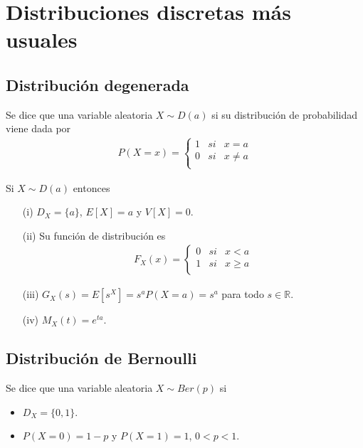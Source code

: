 \chapter{Distribuciones discretas más usuales}


\section{Distribución degenerada}

\begin{defi}
Se dice que una variable aleatoria $X \sim D(a)$ si su distribución de probabilidad viene dada por
\begin{align*}
    P(X = x) = \left\{ \begin{array}{lcc}
             1 &  si  & x = a\\
             0 &  si  & x \not = a\\
             \end{array}
        \right.
\end{align*}
\end{defi}

\begin{obs}
Si $X \sim D(a)$ entonces
\begin{enumerate}
    \item[(i)] $D_X = \{a\}$, $E[X] = a$ y $V[X] = 0$.
    \item[(ii)] Su función de distribución es
    \begin{align*}
        F_X(x) = \left\{ \begin{array}{lcc}
             0 &  si  & x < a\\
             1 &  si  & x \ge a\\
             \end{array}
        \right.
    \end{align*}
    \item[(iii)] $G_X(s) = E[s^X] = s^aP(X = a) = s^a$ para todo $s \in \mathbb{R}$.
    \item[(iv)] $M_X(t) = e^{ta}$.
\end{enumerate}
\end{obs}

\section{Distribución de Bernoulli}

\begin{defi}
Se dice que una variable aleatoria $X \sim Ber(p)$ si
\begin{itemize}
    \item $D_X = \{0, 1\}$.
    \item $P(X = 0) = 1 - p$ y $P(X = 1) = 1$, $0 < p < 1$.
\end{itemize}
\end{defi}

